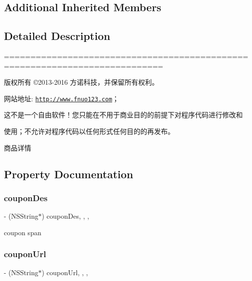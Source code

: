 \subsection*{Additional Inherited Members}


\subsection{Detailed Description}
============================================================================

版权所有 ©2013-\/2016 方诺科技，并保留所有权利。

网站地址\+: \href{http://www.fnuo123.com}{\tt http\+://www.\+fnuo123.\+com}； 



这不是一个自由软件！您只能在不用于商业目的的前提下对程序代码进行修改和

使用；不允许对程序代码以任何形式任何目的的再发布。 



商品详情 

\subsection{Property Documentation}
\mbox{\label{interface_f_n_product_detail_controller_a8155fdc2023786d78ae6d852aac18602}} 
\subsubsection{\texorpdfstring{coupon\+Des}{couponDes}}
{\footnotesize\ttfamily -\/ (N\+S\+String$\ast$) coupon\+Des\hspace{0.3cm}{\ttfamily [read]}, {\ttfamily [write]}, {\ttfamily [nonatomic]}, {\ttfamily [copy]}}

coupon span \mbox{\label{interface_f_n_product_detail_controller_ac90f87110c090db9f5eed494b5dcb194}} 
\subsubsection{\texorpdfstring{coupon\+Url}{couponUrl}}
{\footnotesize\ttfamily -\/ (N\+S\+String$\ast$) coupon\+Url\hspace{0.3cm}{\ttfamily [read]}, {\ttfamily [write]}, {\ttfamily [nonatomic]}, {\ttfamily [copy]}}

